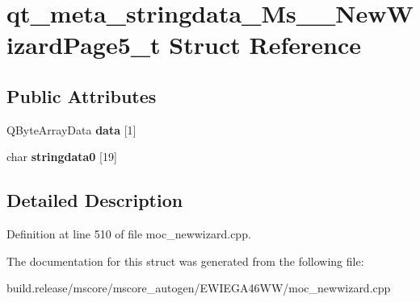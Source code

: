 \hypertarget{structqt__meta__stringdata___ms_____new_wizard_page5__t}{}\section{qt\+\_\+meta\+\_\+stringdata\+\_\+\+Ms\+\_\+\+\_\+\+New\+Wizard\+Page5\+\_\+t Struct Reference}
\label{structqt__meta__stringdata___ms_____new_wizard_page5__t}
\subsection*{Public Attributes}
\begin{DoxyCompactItemize}
\item 
\mbox{\label{structqt__meta__stringdata___ms_____new_wizard_page5__t_a8e9317375b6146c61df60751f3024b8f}} 
Q\+Byte\+Array\+Data {\bfseries data} \mbox{[}1\mbox{]}
\item 
\mbox{\label{structqt__meta__stringdata___ms_____new_wizard_page5__t_aac90a55ef0f85f355eaea4b77bd6d1d2}} 
char {\bfseries stringdata0} \mbox{[}19\mbox{]}
\end{DoxyCompactItemize}


\subsection{Detailed Description}


Definition at line 510 of file moc\+\_\+newwizard.\+cpp.



The documentation for this struct was generated from the following file\+:\begin{DoxyCompactItemize}
\item 
build.\+release/mscore/mscore\+\_\+autogen/\+E\+W\+I\+E\+G\+A46\+W\+W/moc\+\_\+newwizard.\+cpp\end{DoxyCompactItemize}
